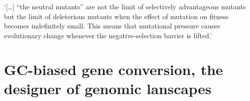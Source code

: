 \begin{savequote}[8cm]


%
%
‘[…] “the neutral mutants” are not the limit of selectively advantageous mutants but the limit of deleterious mutants when the effect of mutation on fitness becomes indefinitely small. This means that mutational pressure causes evolutionary change whenever the negative-selection barrier is lifted.’



\end{savequote}

\chapter{\label{ch:4-gBGC}GC-biased gene conversion, the designer of genomic lanscapes} 

